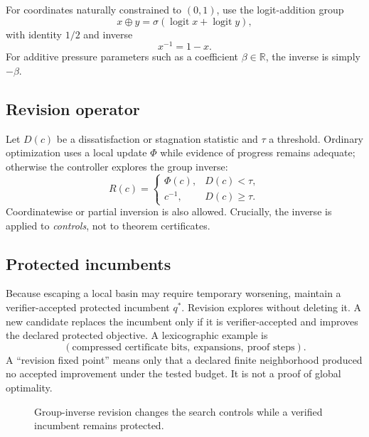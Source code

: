 \documentclass[11pt]{article}
\begin{document}
For coordinates naturally constrained to $(0,1)$, use the logit-addition group
\[
x\oplus y=\sigma(\operatorname{logit}x+\operatorname{logit}y),
\]
with identity $1/2$ and inverse
\[
x^{-1}=1-x.
\]
For additive pressure parameters such as a coefficient $\beta\in\mathbb R$, the inverse is simply $-\beta$.

\subsection{Revision operator}

Let $D(c)$ be a dissatisfaction or stagnation statistic and $\tau$ a threshold. Ordinary optimization uses a local update $\Phi$ while evidence of progress remains adequate; otherwise the controller explores the group inverse:
\[
R(c)=
\begin{cases}
\Phi(c),&D(c)<\tau,\\
c^{-1},&D(c)\ge\tau.
\end{cases}
\]
Coordinatewise or partial inversion is also allowed. Crucially, the inverse is applied to \emph{controls}, not to theorem certificates.

\subsection{Protected incumbents}

Because escaping a local basin may require temporary worsening, maintain a verifier-accepted protected incumbent $q^*$. Revision explores without deleting it. A new candidate replaces the incumbent only if it is verifier-accepted and improves the declared protected objective. A lexicographic example is
\[
(\text{compressed certificate bits},\ \text{expansions},\ \text{proof steps}).
\]
A ``revision fixed point'' means only that a declared finite neighborhood produced no accepted improvement under the tested budget. It is not a proof of global optimality.

\begin{figure}[ht]
\centering
{}
\caption{Group-inverse revision changes the search controls while a verified incumbent remains protected.}
\end{figure}
\end{document}
